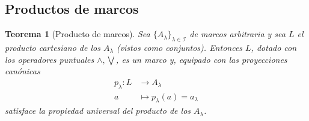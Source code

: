 \documentclass[12pt,letterpaper,titlepage]{article}
\newtheorem{thm}{Teorema}
\theoremstyle{definition}
\newcommand\Sup{\bigvee}
\renewcommand\inf{\wedge}
\newcommand\<{\langle}
\renewcommand\>{\rangle}
\begin{document}
\subsection{Productos de marcos}

\begin{thm}[Producto de marcos]
    Sea $\{A_\lambda\}_{\lambda\in\mathscr{I}}$ de marcos arbitraria
    y sea $L$ el producto cartesiano de los $A_\lambda$
    (vistos como conjuntos).
    Entonces $L$, dotado con los operadores puntuales $\inf,\Sup$,
    es un marco y, equipado con las proyecciones canónicas
    \begin{align*}
        p_\lambda: L&\to A_\lambda \\
        a &\mapsto p_\lambda(a)=a_\lambda
    \end{align*}
    satisface la propiedad universal del producto de los $A_\lambda$.
\end{thm}
\end{document}
